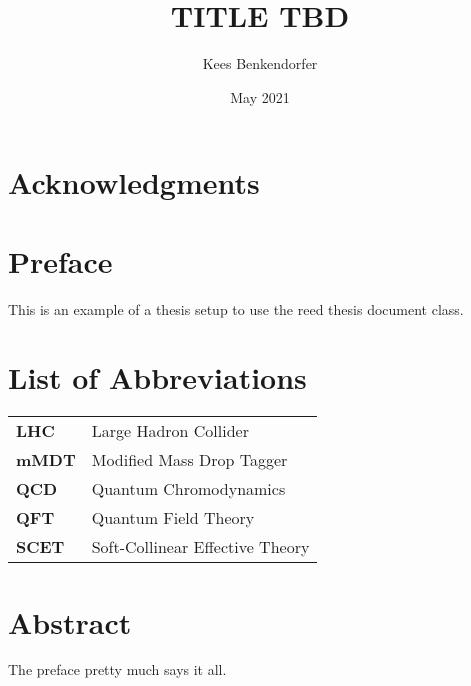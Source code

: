 \documentclass[12pt,twoside]{reedthesis}
\title{TITLE TBD}
\author{Kees Benkendorfer}
\date{May 2021}
\begin{document}
  \maketitle
  \frontmatter %
  \pagestyle{empty} %

    \chapter*{Acknowledgments}

    

    \chapter*{Preface}
	This is an example of a thesis setup to use the reed thesis document class.
	
	

    \chapter*{List of Abbreviations}

	\begin{table}[h]
	\centering %
	\begin{tabular}{ll}
		\textbf{LHC}  	&  Large Hadron Collider \\
		\textbf{mMDT}  	&  Modified Mass Drop Tagger \\
		\textbf{QCD}  	&  Quantum Chromodynamics \\
		\textbf{QFT}  	&  Quantum Field Theory \\
		\textbf{SCET}  	&  Soft-Collinear Effective Theory\\
	\end{tabular}
	\end{table}
	

    \tableofcontents

    \chapter*{Abstract}
	The preface pretty much says it all.
	
\end{document}
